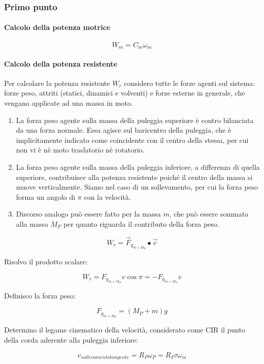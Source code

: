 \documentclass[main.tex]{subfiles}
\begin{document}
\subsubsection{Primo punto}

\paragraph{Calcolo della potenza motrice}

\[
	W_m = C_m\omega_m
\]

\paragraph{Calcolo della potenza resistente}
Per calcolare la potenza resistente $W_r$ considero tutte le forze agenti sul sistema: forze peso, attriti (statici, dinamici e volventi) e forze esterne in generale, che vengano applicate ad una massa in moto.

\begin{enumerate}
\item La forza peso agente sulla massa della puleggia superiore è contro bilanciata da una forza normale. Essa agisce sul baricentro della puleggia, che è implicitamente indicato come coincidente con il centro della stessa, per cui non vi è nè moto traslatorio nè rotatorio.
\item La forza peso agente sulla massa della puleggia inferiore, a differenza di quella superiore, contribuisce alla potenza resistente poiché il centro della massa si muove verticalmente. Siamo nel caso di un sollevamento, per cui la forza peso forma un angolo di $\pi$ con la velocità.
\item Discorso analogo può essere fatto per la massa $m$, che può essere sommata alla massa $M_P$ per quanto riguarda il contributo della forza peso.
\end{enumerate}

\[
	W_r = \vec{F}_{g_{m+M_P}}\bullet\vec{v}
\]

Risolvo il prodotto scalare:

\[
	W_r = F_{g_{m+M_P}}v\cos\pi = - F_{g_{m+M_P}}v
\]

Definisco la forza peso:

\[
	F_{g_{m+M_P}} = (M_P + m)g
\]

Determino il legame cinematico della velocità, considerato come CIR il punto della corda aderente alla puleggia inferiore:

\[
	v_{sollevamento tangente} = R_P\omega_P = R_P\tau\omega_m
\]
\end{document}
